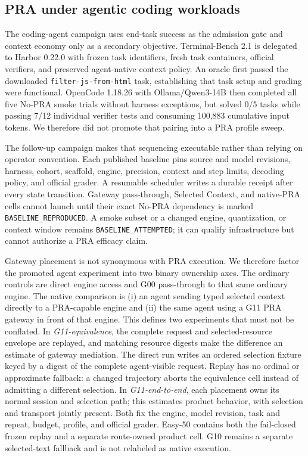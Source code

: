 \documentclass[11pt]{article}
\begin{document}
\subsection{PRA under agentic coding workloads}

The coding-agent campaign uses end-task success as the admission gate and
context economy only as a secondary objective. Terminal-Bench 2.1 is delegated
to Harbor 0.22.0 with frozen task identifiers, fresh task containers, official
verifiers, and preserved agent-native context policy. An oracle first passed
the downloaded \texttt{filter-js-from-html} task, establishing that task setup
and grading were functional. OpenCode 1.18.26 with Ollama/Qwen3-14B then
completed all five No-PRA smoke trials without harness exceptions, but solved
0/5 tasks while passing 7/12 individual verifier tests and consuming 100,883
cumulative input tokens. We therefore did not promote that pairing into a PRA
profile sweep.

The follow-up campaign makes that sequencing executable rather than relying on
operator convention. Each published baseline pins source and model revisions,
harness, cohort, scaffold, engine, precision, context and step limits, decoding
policy, and official grader. A resumable scheduler writes a durable receipt
after every state transition. Gateway pass-through, Selected Context, and
native-PRA cells cannot launch until their exact No-PRA dependency is marked
\texttt{BASELINE\_REPRODUCED}. A smoke subset or a changed engine,
quantization, or context window remains
\texttt{BASELINE\_ATTEMPTED}; it can qualify infrastructure but cannot authorize
a PRA efficacy claim.

Gateway placement is not synonymous with PRA execution. We therefore factor
the promoted agent experiment into two binary ownership axes. The ordinary
controls are direct engine access and G00 pass-through to that same ordinary
engine. The native comparison is (i) an agent sending typed selected context
directly to a PRA-capable engine and (ii) the same agent using a G11 PRA
gateway in front of that engine. This defines two experiments that must not be
conflated. In \emph{G11-equivalence}, the complete request and selected-resource
envelope are replayed, and matching resource digests make the difference an
estimate of gateway mediation. The direct run writes an ordered selection
fixture keyed by a digest of the complete agent-visible request. Replay has no
ordinal or approximate fallback: a changed trajectory aborts the equivalence
cell instead of admitting a different selection. In \emph{G11-end-to-end}, each placement owns
its normal session and selection path; this estimates product behavior, with
selection and transport jointly present. Both fix the engine, model revision,
task and repeat, budget, profile, and official grader. Easy-50 contains both
the fail-closed frozen replay and a separate route-owned product cell. G10
remains a separate selected-text fallback and is not relabeled as native
execution.
\end{document}
